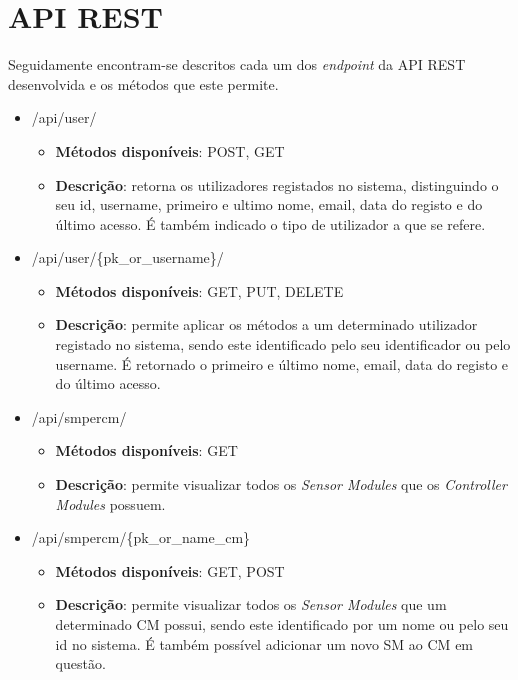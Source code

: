 \chapter{\acl{API} \acs{REST}}
\label{espcifAPIREST}

Seguidamente encontram-se descritos cada um dos \textit{endpoint} da \ac{API} \ac{REST} desenvolvida e os métodos que este permite. 

\begin{itemize}
	\item /api/user/
		\begin{itemize}
			\item\textbf{Métodos disponíveis}: POST, GET
			\item \textbf{Descrição}: retorna os utilizadores registados no sistema, distinguindo o seu id, username, primeiro e ultimo nome, email, data do registo e do último acesso. É também indicado o tipo de utilizador a que se refere. 
		\end{itemize}

	
	\item /api/user/\{pk\_or\_username\}/
		\begin{itemize}
			\item \textbf{Métodos disponíveis}: GET, PUT, DELETE
			\item \textbf{Descrição}: permite aplicar os métodos a um determinado utilizador registado no sistema, sendo este identificado pelo seu identificador ou pelo username. É retornado o primeiro e último nome, email, data do registo e do último acesso.
		\end{itemize}
		
	\item /api/smpercm/
	\begin{itemize}
		\item \textbf{Métodos disponíveis}: GET
		\item \textbf{Descrição}: permite visualizar todos os \textit{Sensor Modules} que os \textit{Controller Modules} possuem.  
	\end{itemize}
	
	\newpage
	
	\item /api/smpercm/\{pk\_or\_name\_cm\}
	\begin{itemize}
		\item \textbf{Métodos disponíveis}: GET, POST
		\item \textbf{Descrição}: permite visualizar todos os \textit{Sensor Modules} que um determinado \acl{CM} possui, sendo este identificado por um nome ou pelo seu id no sistema. É também possível adicionar um novo \acl{SM} ao \acl{CM} em questão. 
	\end{itemize}
	

\end{itemize}
